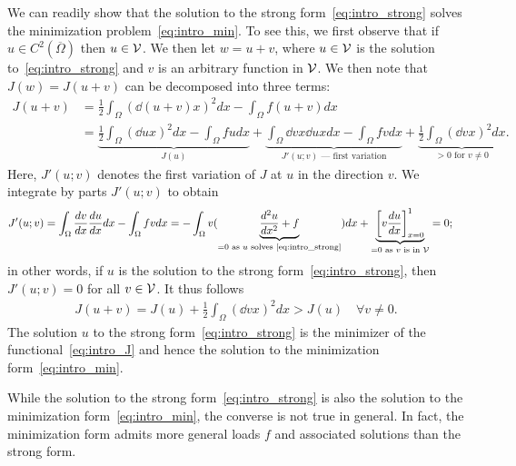 We can readily show that the solution to the strong form~\eqref{eq:intro_strong} solves the minimization problem~\eqref{eq:intro_min}.  To see this, we first observe that if $u \in C^2(\overline \Omega)$ then $u \in \mathcal{V}$.  We then let $w = u + v$, where $u \in \mathcal{V}$ is the solution to~\eqref{eq:intro_strong} and $v$ is an arbitrary function in $\mathcal{V}$.  We then note that $J(w) = J(u+v)$ can be decomposed into three terms:
\begin{align*}
  J(u+v) &= \frac{1}{2} \int_{\Omega} \left( \dd{(u+v)}{x} \right)^2 dx - \int_\Omega f(u+v) dx \\
  &= \underbrace{ \frac{1}{2} \int_{\Omega} \left( \dd{u}{x} \right)^2 dx - \int_\Omega f u dx }_{J(u)}
  + \underbrace{ \int_{\Omega} \dd{v}{x} \dd{u}{x} dx - \int_\Omega f v dx }_{J'(u;v) \text{ --- first variation}}
  + \underbrace{ \frac{1}{2} \int_{\Omega} \left( \dd{v}{x} \right)^2 dx }_{> 0 \text{ for } v \neq 0}.
\end{align*}
Here, $J'(u;v)$ denotes the first variation of $J$ at $u$ in the direction $v$.  We integrate by parts $J'(u;v)$ to obtain
\begin{align*}
  J'(u;v) &= \int_{\Omega} \frac{d v}{d x} \frac{d u}{d x} dx - \int_\Omega f v dx
  =
  - \int_{\Omega} v ( \underbrace{ \frac{d ^2u}{d x^2} + f}_{= 0 \text{ as $u$ solves \eqref{eq:intro_strong}}} ) dx + \underbrace{ \left[ v \frac{d u}{d x} \right]_{x=0}^1 }_{= 0 \text{ as $v$ is in $\mathcal{V}$}}
  = 0;
\end{align*}
in other words, if $u$ is the solution to the strong form~\eqref{eq:intro_strong}, then $J'(u;v) = 0$ for all $v \in \mathcal{V}$. It thus follows
\begin{align*}
  J(u + v) = J(u) + \frac{1}{2} \int_\Omega \left( \dd{v}{x} \right)^2 dx
  > J(u)  \quad \forall v \neq 0.
\end{align*}
The solution $u$ to the strong form~\eqref{eq:intro_strong} is the minimizer of the functional~\eqref{eq:intro_J} and hence the solution to the minimization form~\eqref{eq:intro_min}.

While the solution to the strong form~\eqref{eq:intro_strong} is also the solution to the minimization form~\eqref{eq:intro_min}, the converse is not true in general.  In fact, the minimization form admits more general loads $f$ and associated solutions than the strong form.

